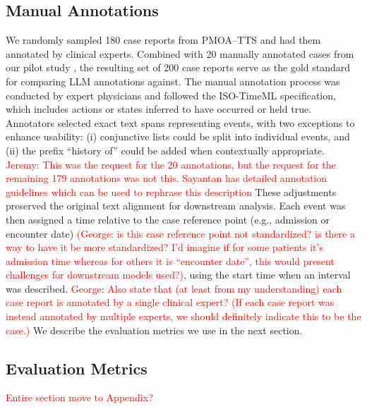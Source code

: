 
\subsection{Manual Annotations}

We randomly sampled 180 case reports from PMOA--TTS and had them annotated by clinical experts. Combined with 20 manually annotated cases from our pilot study \citep{wang2025large}, the resulting set of 200 case reports serve as the gold standard for comparing LLM annotations against. 
The manual annotation process was conducted by expert physicians and followed the ISO-TimeML specification, which includes actions or states inferred to have occurred or held true. 
Annotators selected exact text spans representing events, with two exceptions to enhance usability: (i) conjunctive lists could be split into individual events, and (ii) the prefix ``history of'' could be added when contextually appropriate. \textcolor{red}{Jeremy: This was the request for the 20 annotations, but the request for the remaining 179 annotations was not this.  Sayantan has detailed annotation guidelines which can be used to rephrase this description} 
These adjustments preserved the original text alignment for downstream analysis. 
Each event was then assigned a time relative to the case reference point (e.g., admission or encounter date) \textcolor{red}{(George: is this case reference point not standardized? is there a way to have it be more standardized? I'd imagine if for some patients it's admission time whereas for others it is ``encounter date'', this would present challenges for downstream models used?)}, using the start time when an interval was described.
\textcolor{red}{George: Also state that (at least from my understanding) each case report is annotated by a single clinical expert? (If each case report was instead annotated by multiple experts, we should definitely indicate this to be the case.)}
We describe the evaluation metrics we use in the next section.


\subsection{Evaluation Metrics} \textcolor{red}{Entire section move to Appendix?}


